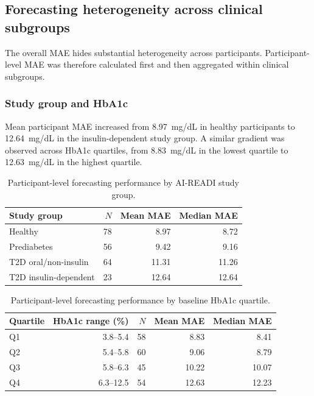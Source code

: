 \subsection{Forecasting heterogeneity across clinical subgroups}
\label{subsec:forecasting_subgroups}

The overall MAE hides substantial heterogeneity across participants.
Participant-level MAE was therefore calculated first and then aggregated within
clinical subgroups.

\subsubsection{Study group and HbA1c}

Mean participant MAE increased from 8.97~mg/dL in healthy participants to
12.64~mg/dL in the insulin-dependent study group. A similar gradient was
observed across HbA1c quartiles, from 8.83~mg/dL in the lowest quartile to
12.63~mg/dL in the highest quartile.

\begin{table}[H]
\centering
\caption{Participant-level forecasting performance by AI-READI study group.}
\label{tab:study_group_forecasting}
\begin{tabular}{lrrr}
\toprule
Study group & $N$ & Mean MAE & Median MAE \\
\midrule
Healthy & 78 & 8.97 & 8.72 \\
Prediabetes & 56 & 9.42 & 9.16 \\
T2D oral/non-insulin & 64 & 11.31 & 11.26 \\
T2D insulin-dependent & 23 & 12.64 & 12.64 \\
\bottomrule
\end{tabular}
\end{table}

\begin{table}[H]
\centering
\caption{Participant-level forecasting performance by baseline HbA1c quartile.}
\label{tab:hba1c_forecasting}
\begin{tabular}{lrrrr}
\toprule
Quartile & HbA1c range (\%) & $N$ & Mean MAE & Median MAE \\
\midrule
Q1 & 3.8--5.4 & 58 & 8.83 & 8.41 \\
Q2 & 5.4--5.8 & 60 & 9.06 & 8.79 \\
Q3 & 5.8--6.3 & 45 & 10.22 & 10.07 \\
Q4 & 6.3--12.5 & 54 & 12.63 & 12.23 \\
\bottomrule
\end{tabular}
\end{table}


